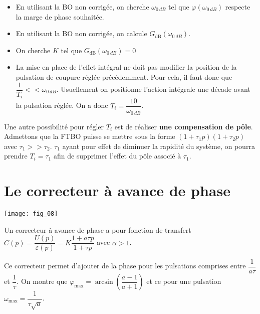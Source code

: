 \begin{methode}
\begin{itemize}
\item En utilisant la BO non corrigée, on cherche $\omega_{\SI{0}{dB}}$ tel que $\varphi(\omega_{\SI{0}{dB}})$ respecte la marge de phase souhaitée. 
\item En utilisant la BO non corrigée, on calcule $G_{\text{dB}}\left(\omega_{\SI{0}{dB}}\right)$. 
\item On cherche $K$ tel que $G_{\text{dB}}\left(\omega_{\SI{0}{dB}}\right)=0$
\item La mise en place de l'effet intégral ne doit pas modifier la position de la pulsation de coupure réglée précédemment. Pour cela, il faut donc que $\dfrac{1}{T_i}<< \omega_{\SI{0}{dB}}$. Usuellement on positionne l'action intégrale une décade avant la pulsation réglée. On a donc $T_i=\dfrac{10}{\omega_{\SI{0}{dB}}}$.
\end{itemize}
\end{methode}


\begin{remarque}
Une autre possibilité pour régler $T_i$ est de réaliser \textbf{une compensation de pôle}. Admettons que la FTBO puisse se mettre sous la forme $(1+\tau_1 p)(1+\tau_2 p)$ avec $\tau_1>>\tau_2$. $\tau_1$ ayant pour effet de diminuer la rapidité du système, on pourra prendre $T_i=\tau_1$ afin de supprimer l'effet du pôle associé à $\tau_1$.
\end{remarque}


\section{Le correcteur à avance de phase}
\begin{marginfigure}
\texttt{[image: fig\_08]}
\end{marginfigure}

\begin{defi}
Un correcteur à avance de phase a pour fonction de transfert $C(p)=\dfrac{U(p)}{\varepsilon(p)}=K\dfrac{1+a\tau p}{1+\tau p}$ avec $\alpha>1$.
\end{defi}


\begin{resultat}
Ce correcteur permet d'ajouter de la phase pour les pulsations comprises entre $\dfrac{1}{a\tau}$ et $\dfrac{1}{\tau}$. On montre que $\varphi_{\text{max}} = \arcsin \left( \dfrac{a-1}{a+1}\right)$ et ce pour une pulsation $\omega_{\text{max}}=\dfrac{1}{\tau\sqrt{a}}$.
\end{resultat}


